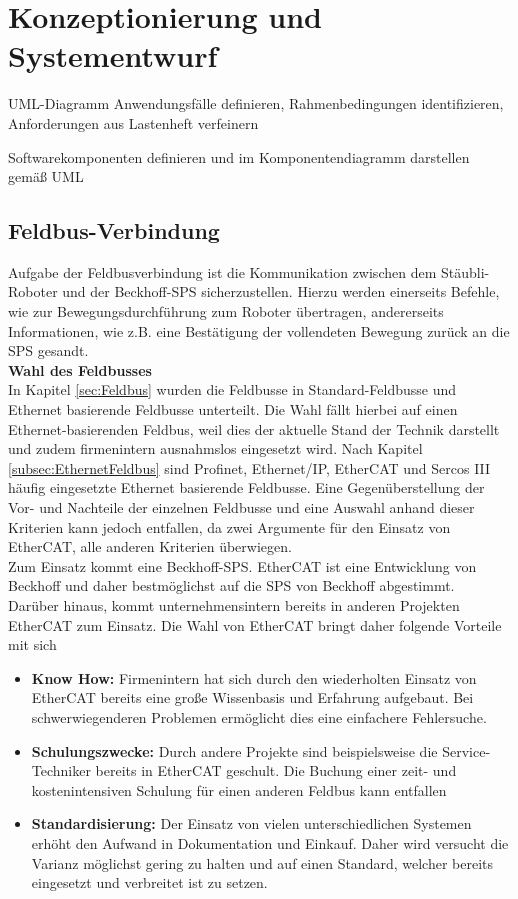 \documentclass[ a4paper,
                oneside,
                toc=bibliography,
                toc=listof
                ]{scrbook}
\begin{document}
	\chapter{Konzeptionierung und Systementwurf}
	UML-Diagramm
	Anwendungsfälle definieren, Rahmenbedingungen identifizieren, Anforderungen aus Lastenheft
	 verfeinern
	 
	 Softwarekomponenten definieren und im Komponentendiagramm darstellen gemäß UML
	\section{Feldbus-Verbindung}
	Aufgabe der Feldbusverbindung ist die Kommunikation zwischen dem Stäubli-Roboter und der Beckhoff-SPS sicherzustellen. Hierzu werden einerseits Befehle, wie zur Bewegungsdurchführung zum Roboter übertragen, andererseits Informationen, wie z.B. eine Bestätigung der vollendeten Bewegung zurück an die SPS gesandt.\\
	\textbf{Wahl des Feldbusses}\\
	In Kapitel \ref{sec:Feldbus} wurden die Feldbusse in Standard-Feldbusse und Ethernet basierende Feldbusse unterteilt. Die Wahl fällt hierbei auf einen Ethernet-basierenden Feldbus, weil dies der aktuelle Stand der Technik darstellt und zudem firmenintern ausnahmslos eingesetzt wird. Nach Kapitel \ref{subsec:EthernetFeldbus} sind Profinet, Ethernet/IP, EtherCAT und Sercos III häufig eingesetzte Ethernet basierende Feldbusse. Eine Gegenüberstellung der Vor- und Nachteile der einzelnen Feldbusse und eine Auswahl anhand dieser Kriterien kann jedoch entfallen, da zwei Argumente für den Einsatz von EtherCAT, alle anderen Kriterien überwiegen.\\
	Zum Einsatz kommt eine Beckhoff-SPS. EtherCAT ist eine Entwicklung von Beckhoff und daher bestmöglichst auf die SPS von Beckhoff abgestimmt.\\
	Darüber hinaus, kommt unternehmensintern bereits in anderen Projekten EtherCAT zum Einsatz. Die Wahl von EtherCAT bringt daher folgende Vorteile mit sich
	\begin{itemize}
		\item \textbf{Know How: } Firmenintern hat sich durch den wiederholten Einsatz von EtherCAT bereits eine große Wissenbasis und Erfahrung aufgebaut. Bei schwerwiegenderen Problemen ermöglicht dies eine einfachere Fehlersuche.
		\item \textbf{Schulungszwecke: } Durch andere Projekte sind beispielsweise die Service-Techniker bereits in EtherCAT geschult. Die Buchung einer zeit- und kostenintensiven Schulung für einen anderen Feldbus kann entfallen
		\item \textbf{Standardisierung:} Der Einsatz von vielen unterschiedlichen Systemen erhöht den Aufwand in Dokumentation und Einkauf. Daher wird versucht die Varianz möglichst gering zu halten und auf einen Standard, welcher bereits eingesetzt und verbreitet ist zu setzen.\\
	\end{itemize}
\end{document}
